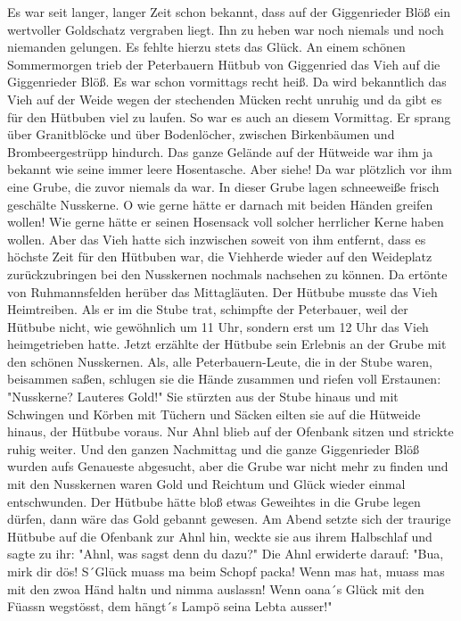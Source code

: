 Es war seit langer, langer Zeit schon bekannt, dass auf der Giggenrieder Blöß
ein wertvoller Goldschatz vergraben liegt. Ihn zu heben war noch niemals und
noch niemanden gelungen. Es fehlte hierzu stets das Glück. An einem schönen
Sommermorgen trieb der Peterbauern Hütbub von Giggenried das Vieh auf die
Giggenrieder Blöß. Es war schon vormittags recht heiß. Da wird bekanntlich das
Vieh auf der Weide wegen der stechenden Mücken recht unruhig und da gibt es für
den Hütbuben viel zu laufen. So war es auch an diesem Vormittag. Er sprang über
Granitblöcke und über Bodenlöcher, zwischen Birkenbäumen und Brombeergestrüpp
hindurch. Das ganze Gelände auf der Hütweide war ihm ja bekannt wie seine immer
leere Hosentasche. Aber siehe! Da war plötzlich vor ihm eine Grube, die zuvor
niemals da war. In dieser Grube lagen schneeweiße frisch geschälte Nusskerne. O
wie gerne hätte er darnach mit beiden Händen greifen wollen! Wie gerne hätte er
seinen Hosensack voll solcher herrlicher Kerne haben wollen. Aber das Vieh hatte
sich inzwischen soweit von ihm entfernt, dass es höchste Zeit für den Hütbuben
war, die Viehherde wieder auf den Weideplatz zurückzubringen bei den Nusskernen
nochmals nachsehen zu können. Da ertönte von Ruhmannsfelden herüber das
Mittagläuten. Der Hütbube musste das Vieh Heimtreiben. Als er im die Stube trat,
schimpfte der Peterbauer, weil der Hütbube nicht, wie gewöhnlich um 11 Uhr,
sondern erst um 12 Uhr das Vieh heimgetrieben hatte. Jetzt erzählte der Hütbube
sein Erlebnis an der Grube mit den schönen Nusskernen. Als, alle
Peterbauern-Leute, die in der Stube waren, beisammen saßen, schlugen sie die
Hände zusammen und riefen voll Erstaunen: "Nusskerne? Lauteres Gold!" Sie
stürzten aus der Stube hinaus und mit Schwingen und Körben mit Tüchern und
Säcken eilten sie auf die Hütweide hinaus, der Hütbube voraus. Nur Ahnl blieb
auf der Ofenbank sitzen und strickte ruhig weiter. Und den ganzen Nachmittag und
die ganze Giggenrieder Blöß wurden aufs Genaueste abgesucht, aber die Grube war
nicht mehr zu finden und mit den Nusskernen waren Gold und Reichtum und Glück
wieder einmal entschwunden. Der Hütbube hätte bloß etwas Geweihtes in die Grube
legen dürfen, dann wäre das Gold gebannt gewesen. Am Abend setzte sich der
traurige Hütbube auf die Ofenbank zur Ahnl hin, weckte sie aus ihrem Halbschlaf
und sagte zu ihr: "Ahnl, was sagst denn du dazu?" Die Ahnl erwiderte darauf:
"Bua, mirk dir dös! S´Glück muass ma beim Schopf packa! Wenn mas hat, muass mas
mit den zwoa Händ haltn und nimma auslassn! Wenn oana´s Glück mit den Füassn
wegstösst, dem hängt´s Lampö seina Lebta ausser!"

